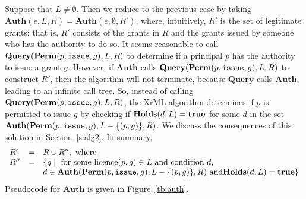 \documentclass{acmtrans2m}
\newcommand{\<}{
}
\renewcommand{\>}{\rangle}
\newcommand{\union}{\cup}
\newcommand{\true}{\mathit{\bf{true}}}
\newcommand{\Permitted}{\mathit{\bf Perm}}
\newcommand{\cd}{d}
\newcommand{\cc}{e}
\newcommand{\issue}{\mathtt{issue}}
\newcommand{\XA}{\textbf{Auth}}
\newcommand{\CMet}{\textbf{Holds}}
\newcommand{\XProc}{\textbf{Query}}
\begin{document}
\begin{sloppypar}
Suppose that $L\ne \emptyset$.  Then we reduce to the previous case by taking
$\XA(\cc,L,R) = \XA(\cc,\emptyset, R')$, where, intuitively, $R'$ is the set of legitimate grants;
that is, $R'$ consists of the grants in $R$ and the grants issued by someone who has the authority
to do so.  It seems reasonable to call $\XProc(\Permitted(p, \issue, g), L, R)$ to determine if a
principal $p$ has the authority to issue a grant $g$.  However, if $\XA$ calls
$\XProc(\Permitted(p, \issue, g), L, R)$ to construct $R'$, then the algorithm will not terminate,
because $\XProc$ calls $\XA$, leading to an infinite call tree.  So, instead of calling
$\XProc(\Permitted(p, \issue, g), L, R)$, the XrML algorithm determines if $p$ is permitted to
issue $g$ by checking if $\CMet(\cd,L) = \true$ for some $\cd$ in the set
$\XA(\Permitted(p, \issue, g), L - \{(p,g)\}, R)$.  We discuss the consequences of this solution
in Section~\ref{s:alg2}.  In summary,
\[
\begin{array}{lll}
R' &=& R\union R'', \mbox{ where}\\
R'' &=& \{g \mid \mbox{ for some licence}(p,g)\in L\mbox{ and condition }\cd,\\
&&\cd\in\XA(\Permitted(p, \issue, g), L-\{(p, g)\}, R)\mbox{ and} \CMet(\cd, L) = \true\}
\end{array}
\]
Pseudocode for $\XA$ is given in Figure~\ref{tb:auth}.
\end{sloppypar}
\end{document}
